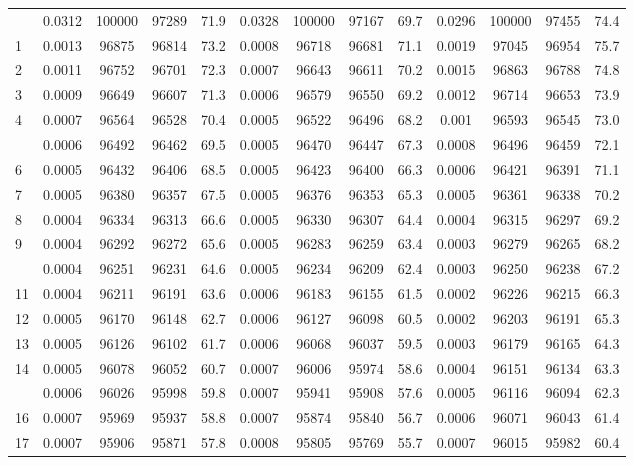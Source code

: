 \documentclass[
  14pt,
]{article}
\begin{document}
\begin{longtable}[t]{lcccccccccccc}
\endfoot
\bottomrule
\endlastfoot
0 & 0.0312 & 100000 & 97289 & 71.9 & 0.0328 & 100000 & 97167 & 69.7 & 0.0296 & 100000 & 97455 & 74.4\\
1 & 0.0013 & 96875 & 96814 & 73.2 & 0.0008 & 96718 & 96681 & 71.1 & 0.0019 & 97045 & 96954 & 75.7\\
2 & 0.0011 & 96752 & 96701 & 72.3 & 0.0007 & 96643 & 96611 & 70.2 & 0.0015 & 96863 & 96788 & 74.8\\
3 & 0.0009 & 96649 & 96607 & 71.3 & 0.0006 & 96579 & 96550 & 69.2 & 0.0012 & 96714 & 96653 & 73.9\\
4 & 0.0007 & 96564 & 96528 & 70.4 & 0.0005 & 96522 & 96496 & 68.2 & 0.001 & 96593 & 96545 & 73.0\\
\addlinespace
5 & 0.0006 & 96492 & 96462 & 69.5 & 0.0005 & 96470 & 96447 & 67.3 & 0.0008 & 96496 & 96459 & 72.1\\
6 & 0.0005 & 96432 & 96406 & 68.5 & 0.0005 & 96423 & 96400 & 66.3 & 0.0006 & 96421 & 96391 & 71.1\\
7 & 0.0005 & 96380 & 96357 & 67.5 & 0.0005 & 96376 & 96353 & 65.3 & 0.0005 & 96361 & 96338 & 70.2\\
8 & 0.0004 & 96334 & 96313 & 66.6 & 0.0005 & 96330 & 96307 & 64.4 & 0.0004 & 96315 & 96297 & 69.2\\
9 & 0.0004 & 96292 & 96272 & 65.6 & 0.0005 & 96283 & 96259 & 63.4 & 0.0003 & 96279 & 96265 & 68.2\\
\addlinespace
10 & 0.0004 & 96251 & 96231 & 64.6 & 0.0005 & 96234 & 96209 & 62.4 & 0.0003 & 96250 & 96238 & 67.2\\
11 & 0.0004 & 96211 & 96191 & 63.6 & 0.0006 & 96183 & 96155 & 61.5 & 0.0002 & 96226 & 96215 & 66.3\\
12 & 0.0005 & 96170 & 96148 & 62.7 & 0.0006 & 96127 & 96098 & 60.5 & 0.0002 & 96203 & 96191 & 65.3\\
13 & 0.0005 & 96126 & 96102 & 61.7 & 0.0006 & 96068 & 96037 & 59.5 & 0.0003 & 96179 & 96165 & 64.3\\
14 & 0.0005 & 96078 & 96052 & 60.7 & 0.0007 & 96006 & 95974 & 58.6 & 0.0004 & 96151 & 96134 & 63.3\\
\addlinespace
15 & 0.0006 & 96026 & 95998 & 59.8 & 0.0007 & 95941 & 95908 & 57.6 & 0.0005 & 96116 & 96094 & 62.3\\
16 & 0.0007 & 95969 & 95937 & 58.8 & 0.0007 & 95874 & 95840 & 56.7 & 0.0006 & 96071 & 96043 & 61.4\\
17 & 0.0007 & 95906 & 95871 & 57.8 & 0.0008 & 95805 & 95769 & 55.7 & 0.0007 & 96015 & 95982 & 60.4\\

\end{longtable}
\end{document}
